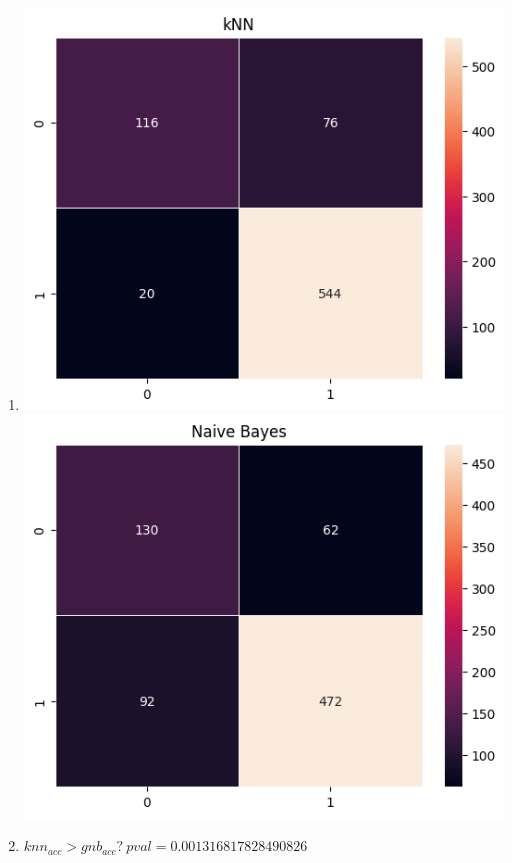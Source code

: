 \documentclass[12pt]{article}
\begin{document}
\begin{enumerate}[leftmargin=\labelsep,resume]
\item  \leavevmode\vadjust{\vspace{-\baselineskip}}
\begin{center}
\includegraphics[scale=0.65]{knn}
\includegraphics[scale=0.65]{naive}
\end{center}
\item
$knn_{acc}>gnb_{acc}? \ pval= 0.001316817828490826 $\\

\end{enumerate}
\end{document}
